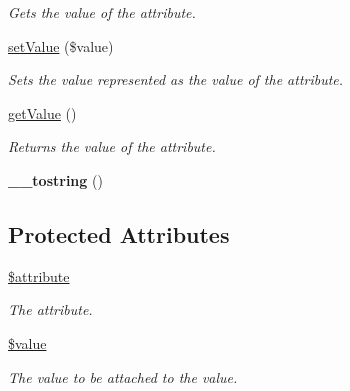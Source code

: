 \begin{DoxyCompactItemize}
\begin{DoxyCompactList}\small\item\em Gets the value of the attribute. \item\end{DoxyCompactList}\item 
\hyperlink{class_attribute_ac11c14ad297148654ecaca68e134cd8f}{setValue} (\$value)
\begin{DoxyCompactList}\small\item\em Sets the value represented as the value of the attribute. \item\end{DoxyCompactList}\item 
\hyperlink{class_attribute_a78772e98f32eeb6862398f128108ed93}{getValue} ()
\begin{DoxyCompactList}\small\item\em Returns the value of the attribute. \item\end{DoxyCompactList}\item 
\hypertarget{class_attribute_ae3fad22b6439f99f700a1cd70f4aece3}{
{\bfseries \_\-\_\-tostring} ()}
\label{class_attribute_ae3fad22b6439f99f700a1cd70f4aece3}

\end{DoxyCompactItemize}
\subsection*{Protected Attributes}
\begin{DoxyCompactItemize}
\item 
\hypertarget{class_attribute_a6ab0485d7429bfaa239ae5be032b0ac8}{
\hyperlink{class_attribute_a6ab0485d7429bfaa239ae5be032b0ac8}{\$attribute}}
\label{class_attribute_a6ab0485d7429bfaa239ae5be032b0ac8}

\begin{DoxyCompactList}\small\item\em The attribute. \item\end{DoxyCompactList}\item 
\hypertarget{class_attribute_a9519d77232b608afcda341faa9eb0777}{
\hyperlink{class_attribute_a9519d77232b608afcda341faa9eb0777}{\$value}}
\label{class_attribute_a9519d77232b608afcda341faa9eb0777}

\begin{DoxyCompactList}\small\item\em The value to be attached to the value. \item\end{DoxyCompactList}\end{DoxyCompactItemize}


